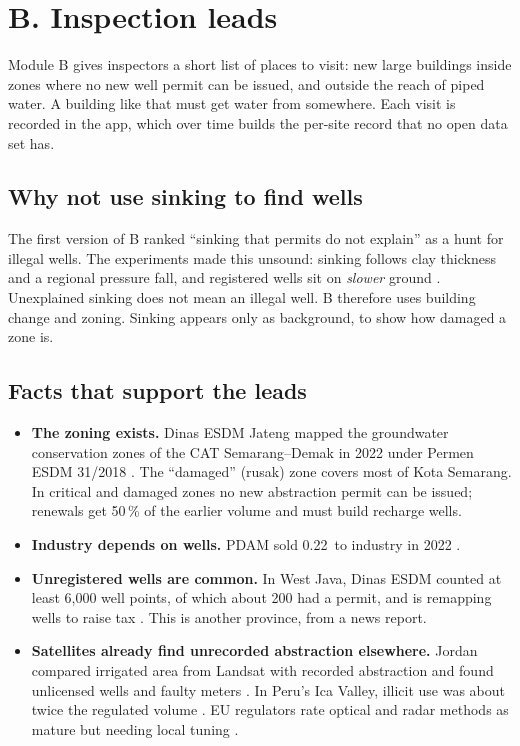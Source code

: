 \section{B. Inspection leads}\label{sec:b}

\begin{inshort}
Module B gives inspectors a short list of places to visit: new large buildings inside zones where no new
well permit can be issued, and outside the reach of piped water. A building like that must get water from
somewhere. Each visit is recorded in the app, which over time builds the per-site record that no open data
set has.
\end{inshort}

\subsection{Why not use sinking to find wells}

The first version of B ranked ``sinking that permits do not explain'' as a hunt for illegal wells. The
experiments made this unsound: sinking follows clay thickness and a regional pressure fall, and registered
wells sit on \emph{slower} ground \cite{exp13,exp14}. Unexplained sinking does not mean an illegal well. B
therefore uses building change and zoning. Sinking appears only as background, to show how damaged a zone
is.

\subsection{Facts that support the leads}

\begin{itemize}
\item \textbf{The zoning exists.} Dinas ESDM Jateng mapped the groundwater conservation zones of the CAT
  Semarang--Demak in 2022 under Permen ESDM 31/2018 \cite{undip,idx} \Off. The ``damaged'' (rusak) zone
  covers most of Kota Semarang. In critical and damaged zones no new abstraction permit can be issued;
  renewals get 50\,\% of the earlier volume and must build recharge wells.
\item \textbf{Industry depends on wells.} PDAM sold 0.22\Mm\ to industry in 2022 \cite{perdasmg} \Off.
\item \textbf{Unregistered wells are common.} In West Java, Dinas ESDM counted at least 6,000 well points,
  of which about 200 had a permit, and is remapping wells to raise tax \cite{ddtcjabar} \Wk. This is
  another province, from a news report.
\item \textbf{Satellites already find unrecorded abstraction elsewhere.} Jordan compared irrigated area from
  Landsat with recorded abstraction and found unlicensed wells and faulty meters \cite{jordan}. In Peru's
  Ica Valley, illicit use was about twice the regulated volume \cite{ica}. EU regulators rate optical and
  radar methods as mature but needing local tuning \cite{impel}.
\end{itemize}

